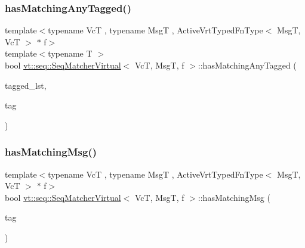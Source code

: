 \mbox{\label{structvt_1_1seq_1_1_seq_matcher_virtual_a7d2af68d054e9fdbc9f8bb4e34992a49}} 
\subsubsection{\texorpdfstring{has\+Matching\+Any\+Tagged()}{hasMatchingAnyTagged()}}
{\footnotesize\ttfamily template$<$typename VcT , typename MsgT , Active\+Vrt\+Typed\+Fn\+Type$<$ Msg\+T, Vc\+T $>$ $\ast$ f$>$ \\
template$<$typename T $>$ \\
bool \hyperlink{structvt_1_1seq_1_1_seq_matcher_virtual}{vt\+::seq\+::\+Seq\+Matcher\+Virtual}$<$ VcT, MsgT, f $>$\+::has\+Matching\+Any\+Tagged (\begin{DoxyParamCaption}\item[{\hyperlink{structvt_1_1seq_1_1_seq_matcher_virtual_ab6b75c420d0d3e46e729188d07c11ff2}{Seq\+State\+Tagged\+Cont\+Type}$<$ T $>$ \&}]{tagged\+\_\+lst,  }\item[{\hyperlink{namespacevt_a84ab281dae04a52a4b243d6bf62d0e52}{Tag\+Type} const \&}]{tag }\end{DoxyParamCaption})\hspace{0.3cm}{\ttfamily [static]}}

\mbox{\label{structvt_1_1seq_1_1_seq_matcher_virtual_ae96fef9bd738d6f93b9b89163efd1770}} 
\subsubsection{\texorpdfstring{has\+Matching\+Msg()}{hasMatchingMsg()}}
{\footnotesize\ttfamily template$<$typename VcT , typename MsgT , Active\+Vrt\+Typed\+Fn\+Type$<$ Msg\+T, Vc\+T $>$ $\ast$ f$>$ \\
bool \hyperlink{structvt_1_1seq_1_1_seq_matcher_virtual}{vt\+::seq\+::\+Seq\+Matcher\+Virtual}$<$ VcT, MsgT, f $>$\+::has\+Matching\+Msg (\begin{DoxyParamCaption}\item[{\hyperlink{namespacevt_a84ab281dae04a52a4b243d6bf62d0e52}{Tag\+Type} const \&}]{tag }\end{DoxyParamCaption})\hspace{0.3cm}{\ttfamily [static]}}



